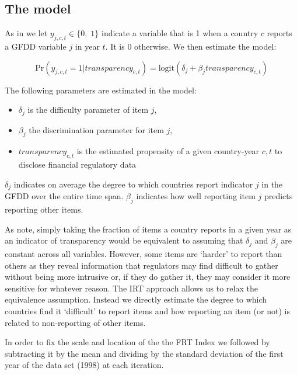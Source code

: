 \documentclass[a4paper]{article}
\begin{document}
\subsection{The model}

As in \cite{Hollyer2014} we let $y_{j,c,t} \in \{0,\; 1\}$ indicate a variable that is 1 when a country $c$ reports a GFDD variable $j$ in year $t$. It is 0 otherwise. We then estimate the model:

\begin{equation}
    \mathrm{Pr}(y_{j,c,t} = 1|transparency_{c,t}) = \mathrm{logit}(\delta_{j} + \beta_{j}transparency_{c,t})
\end{equation}

\noindent The following parameters are estimated in the model:

\begin{itemize}
    \item $\delta_{j}$ is the difficulty parameter of item $j$,
    \item $\beta_{j}$ the discrimination parameter for item $j$,
    \item $transparency_{c,t}$ is the estimated propensity of a given country-year $c,t$ to disclose financial regulatory data
\end{itemize}

\noindent $\delta_{j}$ indicates on average the degree to which countries report indicator $j$ in the GFDD over the entire time span. $\beta_{j}$ indicates how well reporting item $j$ predicts reporting other items. 

As \cite{Hollyer2014} note, simply taking the fraction of items a country reports in a given year as an indicator of transparency would be equivalent to assuming that $\delta_{j}$ and $\beta_{j}$ are constant across all variables. However, some items are `harder' to report than others as they reveal information that regulators may find difficult to gather without being more intrusive or, if they do gather it, they may consider it more sensitive for whatever reason. The IRT approach allows us to relax the equivalence assumption. Instead we directly estimate the degree to which countries find it `difficult' to report items and how reporting an item (or not) is related to non-reporting of other items.

In order to fix the scale and location of the the FRT Index we followed \cite{Hollyer2014} by subtracting it by the mean and dividing by the standard deviation of the first year of the data set (1998) at each iteration. 
\end{document}
